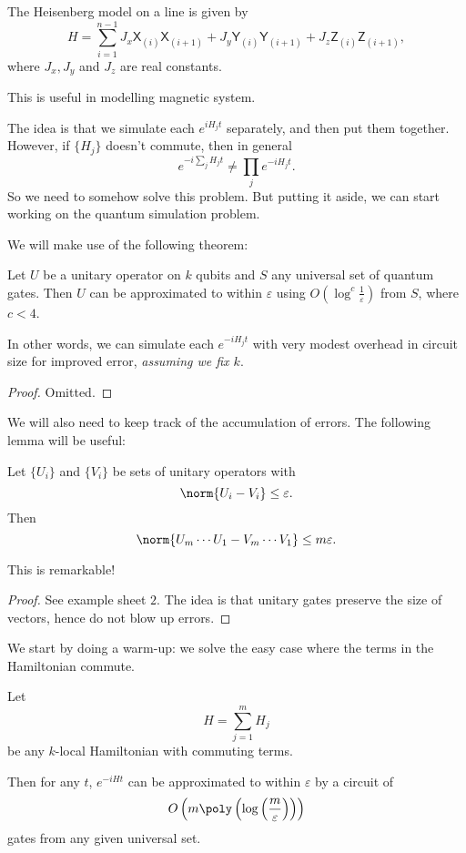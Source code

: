 \documentclass[a4paper]{article}
\newcommand{\qX}{\mathsf{X}}
\newcommand{\qY}{\mathsf{Y}}
\newcommand{\qZ}{\mathsf{Z}}
\begin{document}
\begin{eg}
  The Heisenberg model on a line is given by
  \[
    H = \sum_{i = 1}^{n - 1} J_x \qX_{(i)} \qX_{(i + 1)} + J_y \qY_{(i)}\qY_{(i + 1)} + J_z \qZ_{(i)} \qZ_{(i + 1)},
  \]
  where $J_x, J_y$ and $J_z$ are real constants.

  This is useful in modelling magnetic system.
\end{eg}

The idea is that we simulate each $e^{iH_j t}$ separately, and then put them together. However, if $\{H_j\}$ doesn't commute, then in general
\[
  e^{-i\sum_j H_j t} \not= \prod_j e^{-iH_j t}.
\]
So we need to somehow solve this problem. But putting it aside, we can start working on the quantum simulation problem.

We will make use of the following theorem:
\begin{thm}
  Let $U$ be a unitary operator on $k$ qubits and $S$ any universal set of quantum gates. Then $U$ can be approximated to within $\varepsilon$ using $O(\log^c \frac{1}{\varepsilon})$ from $S$, where $c < 4$.
\end{thm}
In other words, we can simulate each $e^{-iH_j t}$ with very modest overhead in circuit size for improved error, \emph{assuming we fix $k$}.

\begin{proof}
  Omitted.
\end{proof}

We will also need to keep track of the accumulation of errors. The following lemma will be useful:
\begin{lemma}
  Let $\{U_i\}$ and $\{V_i\}$ be sets of unitary operators with
  \[
    \norm{U_i - V_i} \leq \varepsilon.
  \]
  Then
  \[
    \norm{U_m \cdots U_1 - V_m \cdots V_1} \leq m\varepsilon.
  \]
\end{lemma}
This is remarkable!

\begin{proof}
  See example sheet $2$. The idea is that unitary gates preserve the size of vectors, hence do not blow up errors.
\end{proof}

We start by doing a warm-up: we solve the easy case where the terms in the Hamiltonian commute.
\begin{prop}
  Let
  \[
    H = \sum_{j = 1}^m H_j
  \]
  be any $k$-local Hamiltonian with commuting terms.

  Then for any $t$, $e^{-iHt}$ can be approximated to within $\varepsilon$ by a circuit of
  \[
    O\left(m \poly\left(\log\left(\frac{m}{\varepsilon}\right)\right)\right)
  \]
  gates from any given universal set.
\end{prop}
\end{document}
